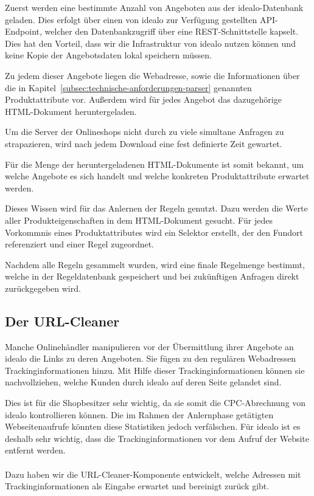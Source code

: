 Zuerst werden eine bestimmte Anzahl von Angeboten aus der idealo-Datenbank geladen.
Dies erfolgt über einen von idealo zur Verfügung gestellten API-Endpoint, welcher den Datenbankzugriff über eine
REST-Schnittstelle kapselt.
Dies hat den Vorteil, dass wir die Infrastruktur von idealo nutzen können und keine Kopie der Angebotsdaten
lokal speichern müssen.

Zu jedem dieser Angebote liegen die Webadresse, sowie die Informationen über die in
Kapitel~\ref{subsec:technische-anforderungen-parser} genannten Produktattribute vor.
Außerdem wird für jedes Angebot das dazugehörige HTML-Dokument heruntergeladen.

Um die Server der Onlineshops nicht durch zu viele simultane Anfragen zu strapazieren, wird nach jedem
Download eine fest definierte Zeit gewartet.

Für die Menge der heruntergeladenen HTML-Dokumente ist somit bekannt, um welche Angebote es sich handelt und welche
konkreten Produktattribute erwartet werden.

Dieses Wissen wird für das Anlernen der Regeln genutzt.
Dazu werden die Werte aller Produkteigenschaften in dem HTML-Dokument gesucht.
Für jedes Vorkommnis eines Produktattributes wird ein Selektor erstellt, der den Fundort referenziert und einer Regel
zugeordnet.

Nachdem alle Regeln gesammelt wurden, wird eine finale Regelmenge bestimmt, welche in der Regeldatenbank gespeichert
und bei zukünftigen Anfragen direkt zurückgegeben wird.

\subsection{Der URL-Cleaner}
\label{subsec:urlcleaner}

Manche Onlinehändler manipulieren vor der Übermittlung ihrer Angebote an idealo die Links zu deren Angeboten.
Sie fügen zu den regulären Webadressen Trackinginformationen hinzu.
Mit Hilfe dieser Trackinginformationen können sie nachvollziehen, welche Kunden durch idealo auf deren Seite gelandet
sind.

Dies ist für die Shopbesitzer sehr wichtig, da sie somit die CPC-Abrechnung von idealo kontrollieren können.
Die im Rahmen der Anlernphase getätigten Webseitenaufrufe könnten diese Statistiken jedoch verfälschen.
Für idealo ist es deshalb sehr wichtig, dass die Trackinginformationen vor dem Aufruf der Website entfernt werden.
\\
~\\
Dazu haben wir die URL-Cleaner-Komponente entwickelt, welche Adressen mit Trackinginformationen als Eingabe erwartet und
bereinigt zurück gibt.

